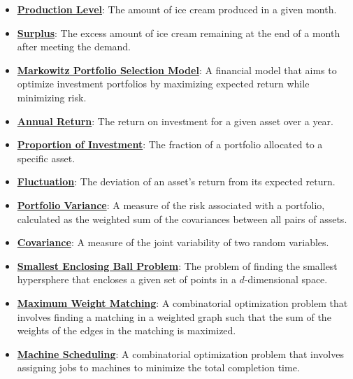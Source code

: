 \documentclass{article}%
\begin{document}
\begin{itemize}[leftmargin=*]
\item \href{https://www.math.purdue.edu/~yipn/421/2024-10-28-ApplsLinProg.pdf#page=3}{\textbf{Production Level}}: The amount of ice cream produced in a given month.%
\item \href{https://www.math.purdue.edu/~yipn/421/2024-10-28-ApplsLinProg.pdf#page=3}{\textbf{Surplus}}: The excess amount of ice cream remaining at the end of a month after meeting the demand.%
\item \href{https://www.math.purdue.edu/~yipn/421/2024-10-28-ApplsLinProg.pdf#page=9}{\textbf{Markowitz Portfolio Selection Model}}: A financial model that aims to optimize investment portfolios by maximizing expected return while minimizing risk.%
\item \href{https://www.math.purdue.edu/~yipn/421/2024-10-28-ApplsLinProg.pdf#page=9}{\textbf{Annual Return}}: The return on investment for a given asset over a year.%
\item \href{https://www.math.purdue.edu/~yipn/421/2024-10-28-ApplsLinProg.pdf#page=9}{\textbf{Proportion of Investment}}: The fraction of a portfolio allocated to a specific asset.%
\item \href{https://www.math.purdue.edu/~yipn/421/2024-10-28-ApplsLinProg.pdf#page=10}{\textbf{Fluctuation}}: The deviation of an asset's return from its expected return.%
\item \href{https://www.math.purdue.edu/~yipn/421/2024-10-28-ApplsLinProg.pdf#page=13}{\textbf{Portfolio Variance}}: A measure of the risk associated with a portfolio, calculated as the weighted sum of the covariances between all pairs of assets.%
\item \href{https://www.math.purdue.edu/~yipn/421/2024-10-28-ApplsLinProg.pdf#page=14}{\textbf{Covariance}}: A measure of the joint variability of two random variables.%
\item \href{https://www.math.purdue.edu/~yipn/421/2024-10-28-ApplsLinProg.pdf#page=17}{\textbf{Smallest Enclosing Ball Problem}}: The problem of finding the smallest hypersphere that encloses a given set of points in a $d$-dimensional space.%
\item \href{https://www.math.purdue.edu/~yipn/421/2024-10-28-ApplsLinProg.pdf#page=19}{\textbf{Maximum Weight Matching}}: A combinatorial optimization problem that involves finding a matching in a weighted graph such that the sum of the weights of the edges in the matching is maximized.%
\item \href{https://www.math.purdue.edu/~yipn/421/2024-10-28-ApplsLinProg.pdf#page=22}{\textbf{Machine Scheduling}}: A combinatorial optimization problem that involves assigning jobs to machines to minimize the total completion time.%

\end{itemize}
\end{document}

